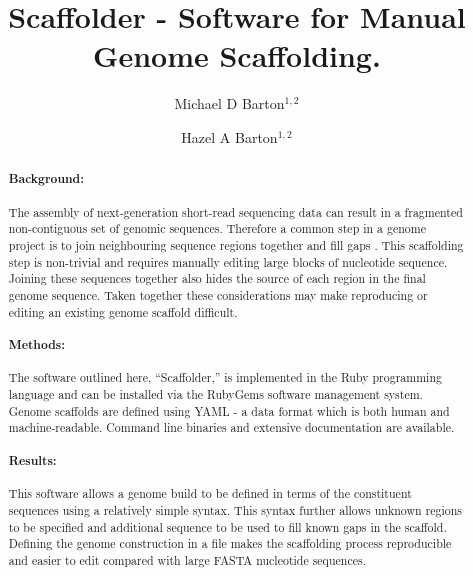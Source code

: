 \documentclass[10pt]{bmc_article}
\newenvironment{bmcformat}{\begin{raggedright}\baselineskip20pt\sloppy\setboolean{publ}{false}}{\end{raggedright}\baselineskip20pt\sloppy}
\begin{document}
\begin{bmcformat}

\title{Scaffolder - Software for Manual Genome
Scaffolding.}

\author{
  Michael D Barton$^{1,2}$\correspondingauthor%
\and
  Hazel A Barton$^{1,2}$%
      }


\address{
\iid(1) Biology Department, The University of Akron, Akron, %
OH 44325-3908, USA \\
\iid(2) Department of Biological Sciences, Northern Kentucky %
University, Nunn Drive, Highland Heights, KY 41076, USA}

\maketitle

\clearpage

\begin{abstract} %

  \paragraph*{Background:} The assembly of next-generation short-read
  sequencing data can result in a fragmented non-contiguous set of genomic
  sequences. Therefore a common step in a genome project is to join
  neighbouring sequence regions together and fill gaps . This scaffolding step
  is non-trivial and requires manually editing large blocks of nucleotide
  sequence. Joining these sequences together also hides the source of each
  region in the final genome sequence. Taken together these considerations
  may make reproducing or editing an existing genome scaffold difficult.

  \paragraph*{Methods:} The software outlined here, ``Scaffolder,'' is
  implemented in the Ruby programming language and can be installed via the
  RubyGems software management system. Genome scaffolds are defined using
  YAML - a data format which is both human and machine-readable. Command line
  binaries and extensive documentation are available.

  \paragraph*{Results:} This software allows a genome build to be defined in
  terms of the constituent sequences using a relatively simple syntax. This
  syntax further allows unknown regions to be specified and additional sequence
  to be used to fill known gaps in the scaffold. Defining the genome construction
  in a file makes the scaffolding process reproducible and easier to edit
  compared with large FASTA nucleotide sequences.


\end{abstract}
\end{bmcformat}
\end{document}
